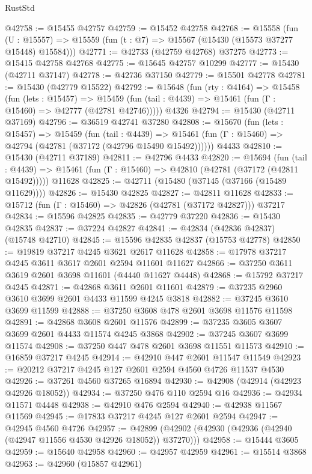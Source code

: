 \begin{lexlean}{RustStd}
\begin{coremodule}
@42758 := @15455 @42757
@42759 := @15452 @42758
@42768 := @15558
    (fun (U : @15557) => @15559 (fun (t : @7) => @15567 (@15430 (@15573 @37277 @15448) @15584)))
@42771 := @42733 (@42759 @42768) @37275
@42773 := @15415 @42758 @42768
@42775 := @15645 @42757 @10299
@42777 := @15430 (@42711 @37147)
@42778 := @42736 @37150
@42779 := @15501 @42778
@42781 := @15430 (@42779 @15522)
@42792 := @15648
    (fun (rty : @4164) =>
    @15458
      (fun (lets : @15457) =>
      @15459 (fun (tail : @4439) => @15461 (fun (Γ : @15460) => @42777 (@42781 @42746)))))
    @4326
@42794 := @15430 (@42711 @37169)
@42796 := @36519 @42741 @37280
@42808 := @15670
    (fun (lets : @15457) =>
    @15459
      (fun (tail : @4439) =>
      @15461 (fun (Γ : @15460) => @42794 (@42781 (@37172 (@42796 @15490 @15492))))))
    @4433
@42810 := @15430 (@42711 @37189)
@42811 := @42796 @4433
@42820 := @15694
    (fun (tail : @4439) => @15461 (fun (Γ : @15460) => @42810 (@42781 (@37172 (@42811 @15492)))))
    @11628
@42825 := @42711 (@15480 (@37145 (@37166 (@15489 @11629))))
@42826 := @15430 @42825
@42827 := @42811 @11628
@42833 := @15712 (fun (Γ : @15460) => @42826 (@42781 (@37172 @42827))) @37217
@42834 := @15596 @42825
@42835 := @42779 @37220
@42836 := @15430 @42835
@42837 := @37224 @42827
@42841 := @42834 (@42836 @42837) (@15748 @42710)
@42845 := @15596 @42835 @42837 (@15753 @42778)
@42850 := @19819 @37217 @4245 @3621 @2617 @11628
@42858 := @17978 @37217 @4245 @3611 @3617 @2601 @2594 @11601 @11627
@42866 := @37250 @3611 @3619 @2601 @3698 @11601 (@4440 @11627 @4448)
@42868 := @15792 @37217 @4245
@42871 := @42868 @3611 @2601 @11601
@42879 := @37235 @2960 @3610 @3699 @2601 @4433 @11599 @4245 @3818
@42882 := @37245 @3610 @3699 @11599
@42888 := @37250 @3608 @478 @2601 @3698 @11576 @11598
@42891 := @42868 @3608 @2601 @11576
@42899 := @37235 @3605 @3607 @3699 @2601 @4433 @11574 @4245 @3868
@42902 := @37245 @3607 @3699 @11574
@42908 := @37250 @447 @478 @2601 @3698 @11551 @11573
@42910 := @16859 @37217 @4245
@42914 := @42910 @447 @2601 @11547 @11549
@42923 := @20212 @37217 @4245 @127 @2601 @2594 @4560 @4726 @11537 @4530
@42926 := @37261 @4560 @37265 @16894
@42930 := @42908 (@42914 (@42923 @42926 @18052))
@42934 := @37250 @476 @110 @2594 @16
@42936 := @42934 @11571 @4448
@42938 := @42910 @476 @2594
@42940 := @42938 @11567 @11569
@42945 := @17833 @37217 @4245 @127 @2601 @2594
@42947 := @42945 @4560 @4726
@42957 := @42899 (@42902 (@42930 (@42936 (@42940 (@42947 @11556 @4530 @42926 @18052)) @37270)))
@42958 := @15444 @3605
@42959 := @15640 @42958
@42960 := @42957 @42959
@42961 := @15514 @3868
@42963 := @42960 (@15857 @42961)

\end{coremodule}
\end{lexlean}
